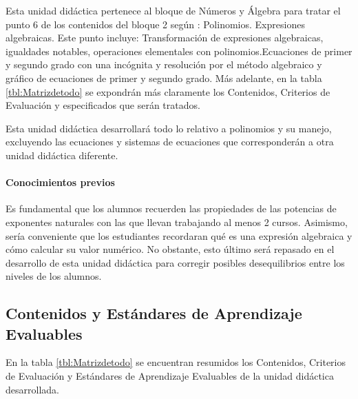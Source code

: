 Esta unidad didáctica pertenece al bloque de Números y Álgebra para tratar el punto 6 de los contenidos del bloque 2 según \bocm: Polinomios. Expresiones algebraicas.
%
Este punto incluye:
%
Transformación de expresiones algebraicas, igualdades notables, operaciones elementales con polinomios.Ecuaciones de primer y segundo grado con una incógnita y resolución por el método algebraico y gráfico de ecuaciones de primer y segundo grado.
%
Más adelante, en la tabla \ref{tbl:Matrizdetodo} se expondrán más claramente los Contenidos, Criterios de Evaluación y \eaes especificados que serán tratados.

Esta unidad didáctica desarrollará todo lo relativo a polinomios y su manejo, excluyendo las ecuaciones y sistemas de ecuaciones que corresponderán a otra unidad didáctica diferente.

\paragraph{Conocimientos previos}

Es fundamental que los alumnos recuerden las propiedades de las potencias de exponentes naturales con las que llevan trabajando al menos 2 cursos.
%
Asimismo, sería conveniente que los estudiantes recordaran qué es una expresión algebraica y cómo calcular su valor numérico.
%
No obstante, esto último será repasado en el desarrollo de esta unidad didáctica para corregir posibles desequilibrios entre los niveles de los alumnos.



\subsection{Contenidos y Estándares de Aprendizaje Evaluables}

En la tabla \ref{tbl:Matrizdetodo} se encuentran resumidos los Contenidos, Criterios de Evaluación y  Estándares de Aprendizaje Evaluables de la unidad didáctica desarrollada.

